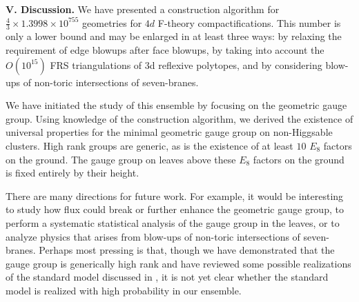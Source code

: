 \documentclass[aps,prl,twocolumn, superscriptaddress,groupedaddress,nofootinbib]{revtex4-1}
\begin{document}
\vspace{.2cm}
\noindent \textbf{V. Discussion.} 
We have presented a construction algorithm for  $\frac43 \times 1.3998\times
10^{755}$ geometries for $4d$ F-theory compactifications. This number is only
a lower bound and may be enlarged in at least three ways: by relaxing
the requirement of edge blowups after  face blowups, by taking into account
the $O(10^{15})$ FRS triangulations of 3d reflexive polytopes, and by
considering blow-ups of non-toric intersections of seven-branes.

We have initiated the study of this ensemble by focusing on the geometric gauge group.
Using knowledge of the construction algorithm, we derived the existence of universal
properties for the minimal geometric gauge group on non-Higgsable clusters. High
rank groups are generic, as is the existence of at least $10$ $E_8$ factors on the ground.
The gauge group on leaves above these $E_8$ factors on the ground is fixed entirely by their height.

There are many directions for future work. For example, it would be
interesting to study how flux could break or further enhance the geometric gauge group, to
perform a systematic statistical analysis of the gauge group in the leaves, or to analyze
physics that arises from blow-ups of non-toric intersections of seven-branes. 
Perhaps most pressing is that, though we have demonstrated that the gauge group is generically 
high rank and have reviewed some possible realizations of the standard model discussed in \cite{Grassi:2014zxa}, it is not yet clear whether the standard model is realized with high probability in our ensemble.

\end{document}
